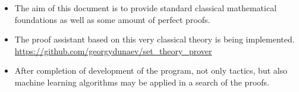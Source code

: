 


\begin{itemize}
\item The aim of this document is to provide standard classical mathematical foundations as well as some amount of perfect proofs.
\item The proof assistant based on this very classical theory is being implemented. \url{https://github.com/georgydunaev/set_theory_prover}
\item After completion of development of the program, not only tactics, but also machine learning algorithms may be applied in a search of the proofs.

\end{itemize}
\newpage

















